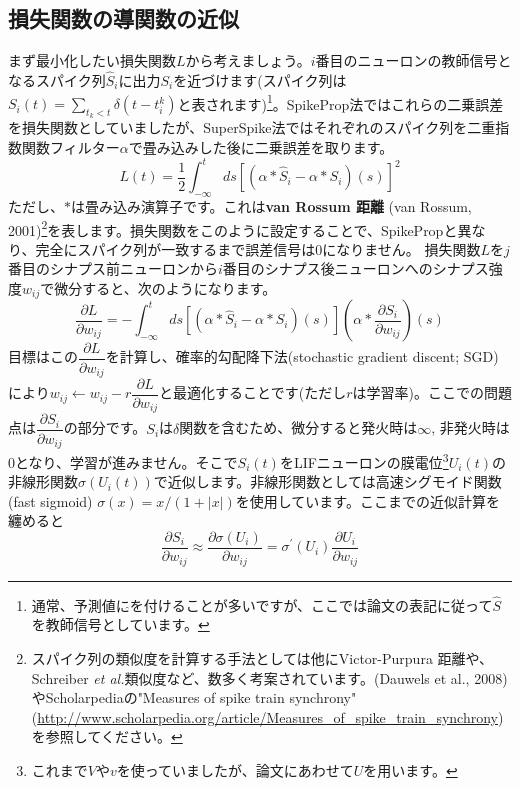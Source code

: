 \subsection{損失関数の導関数の近似}
まず最小化したい損失関数$L$から考えましょう。$i$番目のニューロンの教師信号となるスパイク列$\hat{S}_{i}$に出力${S}_{i}$を近づけます(スパイク列は$S_i(t)=\sum_{t_{k}< t} \delta\left(t-t_i^{k}\right)$と表されます)\footnote{通常、予測値に$\hat{}$を付けることが多いですが、ここでは論文の表記に従って$\hat{S}$を教師信号としています。}。SpikeProp法ではこれらの二乗誤差を損失関数としていましたが、SuperSpike法ではそれぞれのスパイク列を二重指数関数フィルター$\alpha$で畳み込みした後に二乗誤差を取ります。
\begin{equation}
L(t)=\frac{1}{2} \int_{-\infty}^{t} d s\left[\left(\alpha * \hat{S}_{i}-\alpha * S_{i}\right)(s)\right]^{2}
\end{equation}
ただし、$*$は畳み込み演算子です。これは\textbf{van Rossum 距離} (van Rossum, 2001)\footnote{スパイク列の類似度を計算する手法としては他にVictor-Purpura 距離や、 Schreiber \textit{et al.}類似度など、数多く考案されています。(Dauwels et al., 2008)やScholarpediaの"Measures of spike train synchrony"(\url{http://www.scholarpedia.org/article/Measures_of_spike_train_synchrony})を参照してください。}を表します。損失関数をこのように設定することで、SpikePropと異なり、完全にスパイク列が一致するまで誤差信号は0になりません。
損失関数$L$を$j$番目のシナプス前ニューロンから$i$番目のシナプス後ニューロンへのシナプス強度$w_{ij}$で微分すると、次のようになります。
\begin{equation}
\frac{\partial L}{\partial w_{i j}}=-\int_{-\infty}^{t} d s\left[\left(\alpha * \hat{S}_{i}-\alpha * S_{i}\right)(s)\right]\left(\alpha * \frac{\partial S_{i}}{\partial w_{i j}}\right)(s)    
\end{equation}
目標はこの$\dfrac{\partial L}{\partial w_{i j}}$を計算し、確率的勾配降下法(stochastic gradient discent; SGD)により$w_{ij}\leftarrow w_{ij}-r \dfrac{\partial L}{\partial w_{i j}}$と最適化することです(ただし$r$は学習率)。ここでの問題点は$\dfrac{\partial S_{i}}{\partial w_{i j}}$の部分です。$S_i$は$\delta$関数を含むため、微分すると発火時は$\infty$, 非発火時は0となり、学習が進みません。そこで$S_i(t)$をLIFニューロンの膜電位\footnote{これまで$V$や$v$を使っていましたが、論文にあわせて$U$を用います。}$U_i(t)$の非線形関数$\sigma(U_i(t))$で近似します。非線形関数としては高速シグモイド関数(fast sigmoid) $\sigma(x)=x/(1+|x|)$を使用しています。ここまでの近似計算を纏めると
\begin{equation}
\frac{\partial S_{i}}{\partial w_{ij}}\approx\frac{\partial \sigma\left(U_{i}\right)}{\partial w_{ij}}=\sigma^{\prime}\left(U_{i}\right) \frac{\partial U_{i}}{\partial w_{i j}}    
\end{equation}
